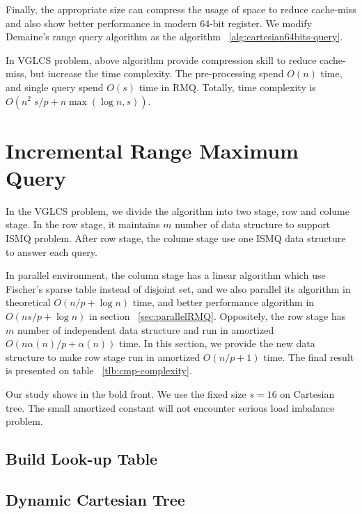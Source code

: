 Finally, the appropriate size can compress the usage of space to
reduce cache-miss and also show better performance in modern 64-bit
register.  We modify Demaine's range query algorithm as the algorithm
~\ref{alg:cartesian64bits-query}.





In VGLCS problem, above algorithm provide compression skill to reduce
cache-miss, but increase the time complexity. The pre-processing spend
$O(n)$ time, and single query spend $O(s)$ time in RMQ. Totally, time
complexity is $O(n^2 \; s / p + n \max(\log n, s))$.


\section{Incremental Range Maximum Query}

In the VGLCS problem, we divide the algorithm into two stage, row and
colume stage. In the row stage, it maintains $m$ number of data
structure to support ISMQ problem. After row stage, the colume stage
use one ISMQ data structure to answer each query.

In parallel environment, the column stage has a linear algorithm which
use Fischer's sparse table instead of disjoint set, and we also
parallel its algorithm in theoretical $O(n / p + \log n)$ time, and
better performance algorithm in $O(n s / p + \log n)$ in section
~\ref{sec:parallelRMQ}.  Oppositely, the row stage has $m$ number of
independent data structure and run in amortized $O(n \alpha(n) / p +
\alpha(n))$ time.  In this section, we provide the new data structure
to make row stage run in amortized $O(n / p + 1)$ time. The final
result is presented on table ~\ref{tlb:cmp-complexity}.

\begin{table*}
  \centering
  

  \caption{   Our study shows in the bold front. We use the fixed size
$s=16$ on Cartesian tree. The small amortized constant will not
encounter serious load imbalance problem.   }

  \label{tlb:cmp-complexity}
\end{table*}

\subsection{Build Look-up Table}

\subsection{Dynamic Cartesian Tree}